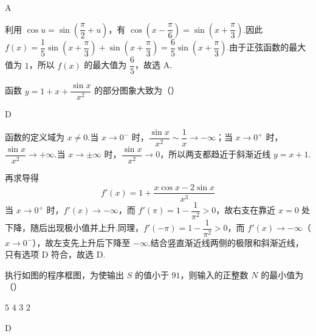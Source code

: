 \begin{answer}
A
\end{answer}

\begin{solution}
利用 \(\cos u=\sin\left(\dfrac\pi2+u\right)\)，有
\(\cos\left(x-\dfrac\pi6\right)=\sin\left(x+\dfrac\pi3\right)\).因此
\(f(x)=\dfrac15\sin\left(x+\dfrac\pi3\right)+\sin\left(x+\dfrac\pi3\right)=\dfrac65\sin\left(x+\dfrac\pi3\right)\).由于正弦函数的最大值为 \(1\)，所以 \(f(x)\) 的最大值为 \(\dfrac65\)，故选 A.
\end{solution}

\begin{problem}
函数 \(y=1+x+\dfrac{\sin x}{x^2}\) 的部分图象大致为（\quad）

    {}
    {}
    {}
\end{problem}

\begin{answer}
D
\end{answer}

\begin{solution}
函数的定义域为 \(x\ne0\).当 \(x\to0^-\) 时，\(\dfrac{\sin x}{x^2}\sim\dfrac1x\to-\infty\)；当 \(x\to0^+\) 时，\(\dfrac{\sin x}{x^2}\to+\infty\).当 \(x\to\pm\infty\) 时，\(\dfrac{\sin x}{x^2}\to0\)，所以两支都趋近于斜渐近线 \(y=x+1\).

再求导得
\[
f'(x)=1+\dfrac{x\cos x-2\sin x}{x^3}
\]
当 \(x\to0^+\) 时，\(f'(x)\to-\infty\)，而 \(f'(\pi)=1-\dfrac1{\pi^2}>0\)，故右支在靠近 \(x=0\) 处下降，随后出现极小值并上升.同理，\(f'(-\pi)=1-\dfrac1{\pi^2}>0\)，而 \(f'(x)\to-\infty\)（\(x\to0^-\)），故左支先上升后下降至 \(-\infty\).结合竖直渐近线两侧的极限和斜渐近线，只有选项 D 符合，故选 D.
\end{solution}

\begin{problem}
执行如图的程序框图，为使输出 \(S\) 的值小于 \(91\)，则输入的正整数 \(N\) 的最小值为（\quad）


\choices
    {\(5\)}
    {\(4\)}
    {\(3\)}
    {\(2\)}
\end{problem}

\begin{answer}
D
\end{answer}

